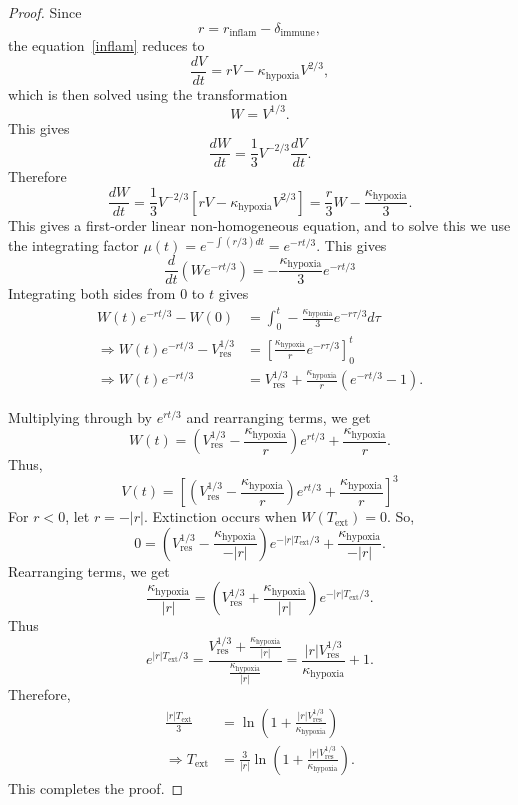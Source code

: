 \documentclass[11pt, reqno]{amsart}
\numberwithin{equation}{section}
\theoremstyle{definition}
\begin{document}
\begin{proof}
Since
\[
r=r_{\mathrm{inflam}}-\delta_{\mathrm{immune}},
\]
the equation~\eqref{inflam} reduces to
\[
\frac{dV}{dt} = rV - \kappa_{\mathrm{hypoxia}}V^{2/3},
\]
which is then solved using the transformation
\[
W=V^{1/3}.
\]
This gives
\[
\frac{dW}{dt} = \frac13 V^{-2/3}\frac{dV}{dt}.
\]
Therefore
\[ \frac{dW}{dt} = \frac{1}{3}V^{-2/3} \left[ rV - \kappa_{\text{hypoxia}}V^{2/3} \right] = \frac{r}{3}W - \frac{\kappa_{\text{hypoxia}}}{3}. \]
This gives a first-order linear non-homogeneous equation, and to solve this we use the integrating factor $\mu(t) = e^{-\int (r/3) dt} = e^{-rt/3}$. This gives
\[ \frac{d}{dt} \left( W e^{-rt/3} \right) = -\frac{\kappa_{\text{hypoxia}}}{3} e^{-rt/3} \]
Integrating both sides from $0$ to $t$ gives 
\begin{align*} 
W(t) e^{-rt/3} - W(0) &= \int_{0}^{t} -\frac{\kappa_{\text{hypoxia}}}{3} e^{-r\tau/3} d\tau \\
\Rightarrow W(t) e^{-rt/3} - V_{\text{res}}^{1/3} &= \left[ \frac{\kappa_{\text{hypoxia}}}{r} e^{-r\tau/3} \right]_{0}^{t}\\
\Rightarrow W(t) e^{-rt/3} &= V_{\text{res}}^{1/3} + \frac{\kappa_{\text{hypoxia}}}{r} \left( e^{-rt/3} - 1 \right). 
\end{align*}

Multiplying through by $e^{rt/3}$ and rearranging terms, we get
\[ W(t) = \left( V_{\text{res}}^{1/3} - \frac{\kappa_{\text{hypoxia}}}{r} \right) e^{rt/3} + \frac{\kappa_{\text{hypoxia}}}{r}. \]
Thus,
\[ V(t) = \left[ \left( V_{\text{res}}^{1/3} - \frac{\kappa_{\text{hypoxia}}}{r} \right) e^{rt/3} + \frac{\kappa_{\text{hypoxia}}}{r} \right]^3 \]
For $r < 0$, let $r = -|r|$. Extinction occurs when $W(T_{\text{ext}}) = 0$. So,
\[ 0 = \left( V_{\text{res}}^{1/3} - \frac{\kappa_{\text{hypoxia}}}{-|r|} \right) e^{-|r|T_{\text{ext}}/3} + \frac{\kappa_{\text{hypoxia}}}{-|r|}. \]
Rearranging terms, we get
\[ \frac{\kappa_{\text{hypoxia}}}{|r|} = \left( V_{\text{res}}^{1/3} + \frac{\kappa_{\text{hypoxia}}}{|r|} \right) e^{-|r|T_{\text{ext}}/3}. \]
Thus
\[ e^{|r|T_{\text{ext}}/3} = \frac{V_{\text{res}}^{1/3} + \frac{\kappa_{\text{hypoxia}}}{|r|}}{\frac{\kappa_{\text{hypoxia}}}{|r|}} = \frac{|r|V_{\text{res}}^{1/3}}{\kappa_{\text{hypoxia}}} + 1. \]
Therefore,
\begin{align*} \frac{|r|T_{\text{ext}}}{3} &= \ln \left( 1 + \frac{|r|V_{\text{res}}^{1/3}}{\kappa_{\text{hypoxia}}} \right)\\ \Rightarrow T_{\text{ext}} &= \frac{3}{|r|} \ln \left( 1 + \frac{|r|V_{\text{res}}^{1/3}}{\kappa_{\text{hypoxia}}} \right).
\end{align*}
This completes the proof.
\end{proof}
\end{document}
